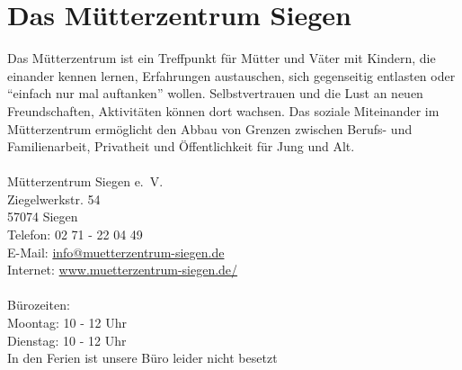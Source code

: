 \section{Das Mütterzentrum Siegen}
Das Mütterzentrum ist ein Treffpunkt für Mütter und Väter mit Kindern, die einander kennen lernen, Erfahrungen austauschen, sich gegenseitig entlasten oder \enquote{einfach nur mal auftanken} wollen. Selbstvertrauen und die Lust an neuen Freundschaften, Aktivitäten können dort wachsen. Das soziale Miteinander im Mütterzentrum ermöglicht den Abbau von Grenzen zwischen Berufs- und  Familienarbeit, Privatheit und Öffentlichkeit für Jung und Alt.\\
\\
Mütterzentrum Siegen e.~V.\\
Ziegelwerkstr. 54\\
57074 Siegen\\
Telefon: 02 71 - 22 04 49\\
E-Mail: \href{info@muetterzentrum-siegen.de}{info@muetterzentrum-siegen.de} \\
Internet: \href{http://www.muetterzentrum-siegen.de/}{www.muetterzentrum-siegen.de/}\\
\\
Bürozeiten: \\
Moontag: 10 - 12 Uhr\\
Dienstag: 10 - 12 Uhr\\
In den Ferien ist unsere Büro leider nicht besetzt
